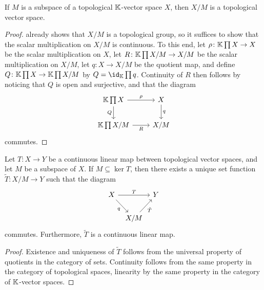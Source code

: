 \documentclass[article, a4paper, 11pt, oneside]{memoir}
\numberwithin{equation}{chapter}
\begin{document}
\begin{theorem}
    If $M$ is a subspace of a topological $\mathbb{K}$-vector space $X$, then $X/M$ is a topological vector space.
\end{theorem}

\begin{proof}
     already shows that $X/M$ is a topological group, so it suffices to show that the scalar multiplication on $X/M$ is continuous. To this end, let $\rho \colon \mathbb{K} \prod X \to X$ be the scalar multiplication on $X$, let $R \colon \mathbb{K} \prod X/M \to X/M$ be the scalar multiplication on $X/M$, let $q \colon X \to X/M$ be the quotient map, and define $Q \colon \mathbb{K} \prod X \to \mathbb{K} \prod X/M$ by $Q = \id_\field \prod q$. Continuity of $R$ then follows by noticing that $Q$ is open and surjective, and that the diagram
    \begin{equation*}
        \begin{tikzcd}
            \field \prod X
                \ar[r, "\rho"]
                \ar[d, "Q", swap]
            & X
                \ar[d, "q"]
            \\
            \field \prod X/M
                \ar[r, "R", swap]
            & X/M
        \end{tikzcd}
    \end{equation*}
    commutes.
\end{proof}


\begin{proposition}
    \label{thm:quotient-space-factorisation}
    Let $T \colon X \to Y$ be a continuous linear map between topological vector spaces, and let $M$ be a subspace of $X$. If $M \subseteq \ker T$, then there exists a unique set function $\tilde{T} \colon X/M \to Y$ such that the diagram
    \begin{equation*}
        \begin{tikzcd}[column sep=tiny]
            X
                \ar[rr, "T"]
                \ar[dr, "q", swap]
            && Y
            \\
            & X/M
                \ar[ur, "\tilde{T}", swap]
        \end{tikzcd}
    \end{equation*}
    commutes. Furthermore, $\tilde{T}$ is a continuous linear map.
\end{proposition}

\begin{proof}
    Existence and uniqueness of $\tilde{T}$ follows from the universal property of quotients in the category of sets. Continuity follows from the same property in the category of topological spaces, linearity by the same property in the category of $\mathbb{K}$-vector spaces.
\end{proof}
\end{document}
